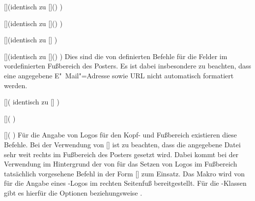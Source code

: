 \begin{Bundle*}{}
\begin{Declaration}{[]}(identisch zu 
  []()%
)
\begin{Declaration}{[]}(identisch zu 
  []()%
)
\begin{Declaration}{[]}(identisch zu 
  []%
)
\begin{Declaration}{[]}(identisch zu 
  []()%
)
\printdeclarationlist%
%
Dies sind die von  definierten Befehle für die Felder im 
vordefinierten Fußbereich des Posters. Es ist dabei insbesondere zu beachten, 
dass eine angegebene E"~Mail"=Adresse sowie URL nicht automatisch formatiert 
werden.
\end{Declaration}
\end{Declaration}
\end{Declaration}
\end{Declaration}


\begin{Declaration}{[]}(%
  identisch zu []
)
\begin{Declaration}{[]}(%
)
\begin{Declaration}{[]}(%
)
\printdeclarationlist%
%
Für die Angabe von Logos für den Kopf- und Fußbereich existieren diese Befehle. 
Bei der Verwendung von [] ist zu 
beachten, dass die angegebene Datei sehr weit rechts im Fußbereich des Posters 
gesetzt wird. Dabei kommt bei der Verwendung im Hintergrund der von \TUDScript 
für das Setzen von Logos im Fußbereich tatsächlich vorgesehene Befehl in der 
Form []
zum Einsatz. Das Makro  wird von  für 
die Angabe eines \DDC-Logos im rechten Seitenfuß bereitgestellt. Für die 
\TUDScript-Klassen gibt es hierfür die Optionen  beziehungsweise 
.
\end{Declaration}
\end{Declaration}
\end{Declaration}


\end{Bundle*}
